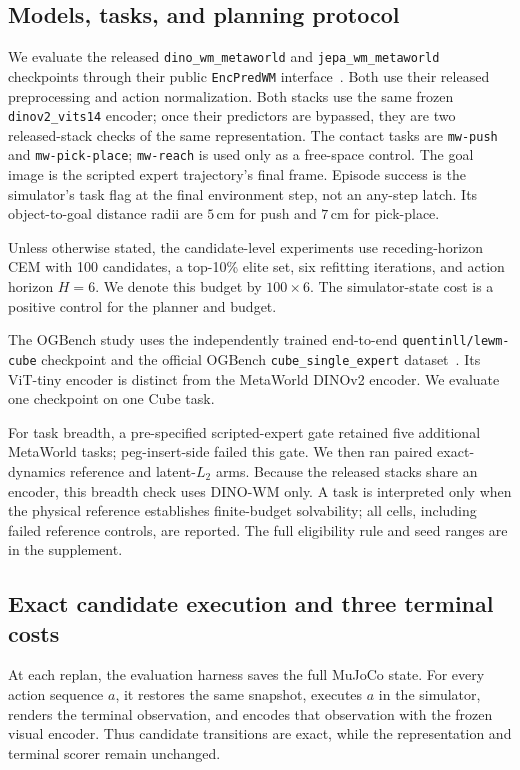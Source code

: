 \documentclass[10pt]{article}
\begin{document}
\subsection{Models, tasks, and planning protocol}

We evaluate the released \texttt{dino\_wm\_metaworld} and
\texttt{jepa\_wm\_metaworld} checkpoints through their public
\texttt{EncPredWM} interface~\citep{jepawms2025}. Both use their released
preprocessing and action normalization. Both stacks use the same frozen
\texttt{dinov2\_vits14} encoder; once their predictors are bypassed, they are
two released-stack checks of the same representation. The contact tasks are
\texttt{mw-push} and \texttt{mw-pick-place}; \texttt{mw-reach} is used only as
a free-space control. The goal image is the scripted expert trajectory's final
frame. Episode success is the simulator's task flag at the final environment
step, not an any-step latch. Its object-to-goal distance radii are $5$\,cm for
push and $7$\,cm for pick-place.

Unless otherwise stated, the candidate-level experiments use receding-horizon CEM
\citep{rubinstein1997cem} with 100 candidates, a top-10\% elite set, six
refitting iterations, and action horizon $H=6$. We denote this budget by
$100\times6$. The simulator-state cost is a positive control for the planner
and budget.

The OGBench study uses the independently trained end-to-end
\texttt{quentinll/lewm-cube} checkpoint and the official OGBench
\texttt{cube\_single\_expert} dataset~\citep{maes2026lewm,park2025ogbench}. Its
ViT-tiny encoder is distinct from the MetaWorld DINOv2 encoder. We evaluate one
checkpoint on one Cube task.

For task breadth, a pre-specified scripted-expert gate retained five additional
MetaWorld tasks; peg-insert-side failed this gate. We then ran paired
exact-dynamics reference and latent-$L_2$ arms. Because the released stacks
share an encoder, this breadth check uses DINO-WM only. A task is interpreted
only when the physical reference establishes finite-budget solvability; all
cells, including failed reference controls, are reported. The full eligibility
rule and seed ranges are in the supplement.

\subsection{Exact candidate execution and three terminal costs}

At each replan, the evaluation harness saves the full MuJoCo state. For
every action sequence $a$, it restores the same snapshot, executes $a$ in the
simulator, renders the terminal observation, and encodes that observation with
the frozen visual encoder. Thus candidate transitions are exact, while the
representation and terminal scorer remain unchanged.
\end{document}
